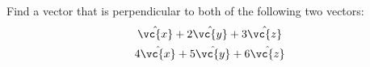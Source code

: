         Find a vector that is perpendicular to both of the following two vectors:
        \begin{gather*}
          \hat{\vc{x}}+2\hat{\vc{y}}+3\hat{\vc{z}} \\
          4\hat{\vc{x}}+5\hat{\vc{y}}+6\hat{\vc{z}} 
        \end{gather*}
\answercheck
